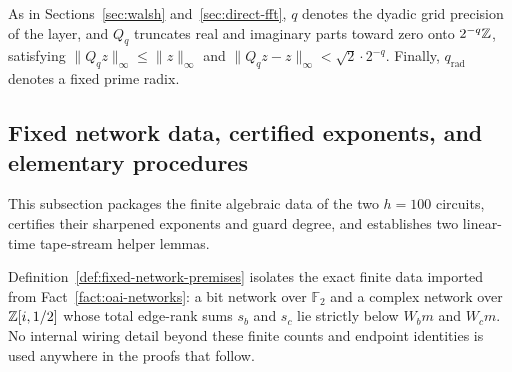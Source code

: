 As in Sections~\ref{sec:walsh} and~\ref{sec:direct-fft}, $q$ denotes the dyadic grid precision of the layer, and $Q_q$ truncates real and imaginary parts toward zero onto $2^{-q}\mathbb{Z}$, satisfying $\|Q_qz\|_\infty\le\|z\|_\infty$ and $\|Q_qz-z\|_\infty<\sqrt2\cdot2^{-q}$. Finally, $q_{\mathrm{rad}}$ denotes a fixed prime radix.

\subsection{Fixed network data, certified exponents, and elementary procedures}\label{sec:transfer-premises}

This subsection packages the finite algebraic data of the two $h=100$ circuits, certifies their sharpened exponents and guard degree, and establishes two linear-time tape-stream helper lemmas.

Definition~\ref{def:fixed-network-premises} isolates the exact finite data imported from Fact~\ref{fact:oai-networks}: a bit network over $\mathbb F_2$ and a complex network over $\mathbb{Z}[i,1/2]$ whose total edge-rank sums $s_b$ and $s_c$ lie strictly below $W_b m$ and $W_c m$. No internal wiring detail beyond these finite counts and endpoint identities is used anywhere in the proofs that follow.

